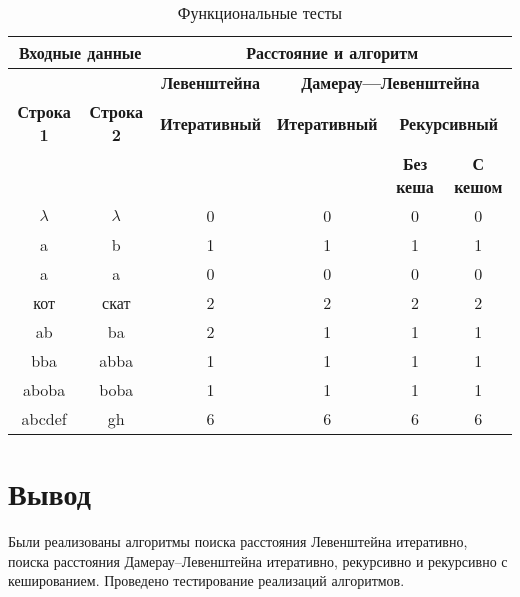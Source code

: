 \begin{table}[ht]
	\small
	\begin{center}
		\begin{threeparttable}
			\caption{Функциональные тесты}
			\label{tbl:func_tests}
			\begin{tabular}{|c|c|c|c|c|c|}
				\hline
				\multicolumn{2}{|c|}{\bfseries Входные данные}
				& \multicolumn{4}{c|}{\bfseries Расстояние и алгоритм} \\ 
				\hline 
				&
				& \multicolumn{1}{c|}{\bfseries Левенштейна} 
				& \multicolumn{3}{c|}{\bfseries Дамерау---Левенштейна} \\ \cline{3-6}
				
				\bfseries Строка 1 & \bfseries Строка 2 & \bfseries Итеративный & \bfseries Итеративный
				
				& \multicolumn{2}{c|}{\bfseries Рекурсивный} \\ \cline{5-6}
				& & & & \bfseries Без кеша & \bfseries С кешом \\
				\hline
				$\lambda$ & $\lambda$ & 0 & 0 & 0 & 0 \\
				\hline
				a & b & 1 & 1 & 1 & 1 \\
				\hline
				a & a & 0 & 0 & 0 & 0 \\
				\hline
				кот & скат & 2 & 2 & 2 & 2 \\
				\hline
				ab & ba & 2 & 1 & 1 & 1 \\
				\hline
				bba & abba & 1 & 1 & 1 & 1 \\
				\hline
				aboba & boba & 1 & 1 & 1 & 1 \\
				\hline
				abcdef & gh & 6 & 6 & 6 & 6 \\
				\hline
				
			\end{tabular}	
		\end{threeparttable}
	\end{center}
\end{table}

\section*{Вывод}

Были реализованы алгоритмы поиска расстояния Левенштейна итеративно, поиска расстояния Дамерау–Левенштейна итеративно, рекурсивно и рекурсивно с кешированием. Проведено тестирование реализаций алгоритмов.
